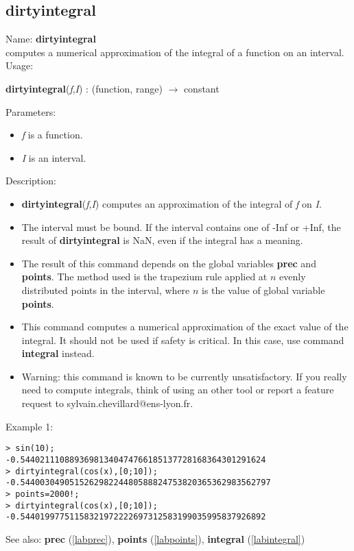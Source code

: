 \subsection{dirtyintegral}
\label{labdirtyintegral}
\noindent Name: \textbf{dirtyintegral}\\
computes a numerical approximation of the integral of a function on an interval.\\

\noindent Usage: 
\begin{center}
\textbf{dirtyintegral}(\emph{f},\emph{I}) : (\textsf{function}, \textsf{range}) $\rightarrow$ \textsf{constant}\\
\end{center}
Parameters: 
\begin{itemize}
\item \emph{f} is a function.
\item \emph{I} is an interval.
\end{itemize}
\noindent Description: \begin{itemize}

\item \textbf{dirtyintegral}(\emph{f},\emph{I}) computes an approximation of the integral of \emph{f} on \emph{I}.

\item The interval must be bound. If the interval contains one of -Inf or +Inf, the 
   result of \textbf{dirtyintegral} is NaN, even if the integral has a meaning.

\item The result of this command depends on the global variables \textbf{prec} and \textbf{points}.
   The method used is the trapezium rule applied at $n$ evenly distributed
   points in the interval, where $n$ is the value of global variable \textbf{points}.

\item This command computes a numerical approximation of the exact value of the 
   integral. It should not be used if safety is critical. In this case, use
   command \textbf{integral} instead.

\item Warning: this command is known to be currently unsatisfactory. If you really
   need to compute integrals, think of using an other tool or report a feature
   request to sylvain.chevillard@ens-lyon.fr.
\end{itemize}
\noindent Example 1: 
\begin{center}\begin{minipage}{15cm}\begin{Verbatim}[frame=single]
> sin(10);
-0.54402111088936981340474766185137728168364301291624
> dirtyintegral(cos(x),[0;10]);
-0.544003049051526298224480588824753820365362983562797
> points=2000!;
> dirtyintegral(cos(x),[0;10]);
-0.54401997751158321972222697312583199035995837926892
\end{Verbatim}
\end{minipage}\end{center}
See also: \textbf{prec} (\ref{labprec}), \textbf{points} (\ref{labpoints}), \textbf{integral} (\ref{labintegral})
